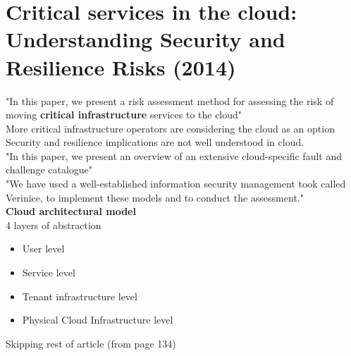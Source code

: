 \section{Critical services in the cloud: Understanding Security and Resilience Risks (2014)}
"In this paper, we present a risk assessment method for assessing the risk of moving \textbf{critical infrastructure} services to the cloud" \\
More critical infrastructure operators are considering the cloud as an option \\
Security and resilience implications are not well understood in cloud.
\\
"In this paper, we present an overview of an extensive cloud-specific fault and challenge catalogue" \\
"We have used a well-established information security management took called Verinice, to implement these models and to conduct the assessment."
\\
\textbf{Cloud architectural model} \\
4 layers of abstraction
\begin{itemize}
	\item User level
	\item Service level
	\item Tenant infrastructure level
	\item Physical Cloud Infrastructure level
\end{itemize}

Skipping rest of article (from page 134)
